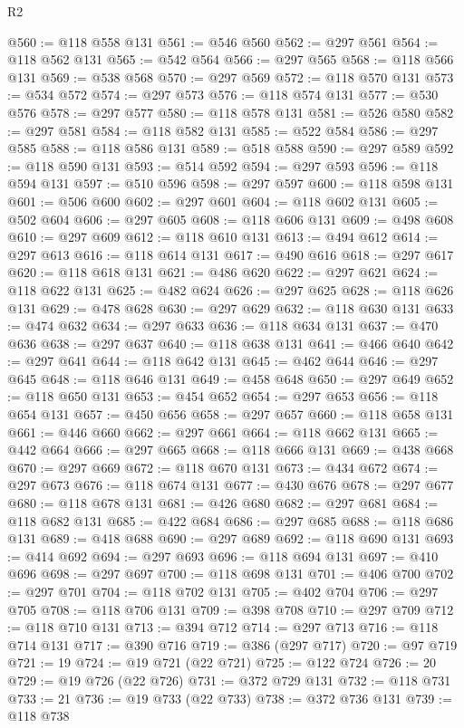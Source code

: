 \begin{lexlean}{R2}
\begin{coremodule}
@560 := @118 @558 @131
@561 := @546 @560
@562 := @297 @561
@564 := @118 @562 @131
@565 := @542 @564
@566 := @297 @565
@568 := @118 @566 @131
@569 := @538 @568
@570 := @297 @569
@572 := @118 @570 @131
@573 := @534 @572
@574 := @297 @573
@576 := @118 @574 @131
@577 := @530 @576
@578 := @297 @577
@580 := @118 @578 @131
@581 := @526 @580
@582 := @297 @581
@584 := @118 @582 @131
@585 := @522 @584
@586 := @297 @585
@588 := @118 @586 @131
@589 := @518 @588
@590 := @297 @589
@592 := @118 @590 @131
@593 := @514 @592
@594 := @297 @593
@596 := @118 @594 @131
@597 := @510 @596
@598 := @297 @597
@600 := @118 @598 @131
@601 := @506 @600
@602 := @297 @601
@604 := @118 @602 @131
@605 := @502 @604
@606 := @297 @605
@608 := @118 @606 @131
@609 := @498 @608
@610 := @297 @609
@612 := @118 @610 @131
@613 := @494 @612
@614 := @297 @613
@616 := @118 @614 @131
@617 := @490 @616
@618 := @297 @617
@620 := @118 @618 @131
@621 := @486 @620
@622 := @297 @621
@624 := @118 @622 @131
@625 := @482 @624
@626 := @297 @625
@628 := @118 @626 @131
@629 := @478 @628
@630 := @297 @629
@632 := @118 @630 @131
@633 := @474 @632
@634 := @297 @633
@636 := @118 @634 @131
@637 := @470 @636
@638 := @297 @637
@640 := @118 @638 @131
@641 := @466 @640
@642 := @297 @641
@644 := @118 @642 @131
@645 := @462 @644
@646 := @297 @645
@648 := @118 @646 @131
@649 := @458 @648
@650 := @297 @649
@652 := @118 @650 @131
@653 := @454 @652
@654 := @297 @653
@656 := @118 @654 @131
@657 := @450 @656
@658 := @297 @657
@660 := @118 @658 @131
@661 := @446 @660
@662 := @297 @661
@664 := @118 @662 @131
@665 := @442 @664
@666 := @297 @665
@668 := @118 @666 @131
@669 := @438 @668
@670 := @297 @669
@672 := @118 @670 @131
@673 := @434 @672
@674 := @297 @673
@676 := @118 @674 @131
@677 := @430 @676
@678 := @297 @677
@680 := @118 @678 @131
@681 := @426 @680
@682 := @297 @681
@684 := @118 @682 @131
@685 := @422 @684
@686 := @297 @685
@688 := @118 @686 @131
@689 := @418 @688
@690 := @297 @689
@692 := @118 @690 @131
@693 := @414 @692
@694 := @297 @693
@696 := @118 @694 @131
@697 := @410 @696
@698 := @297 @697
@700 := @118 @698 @131
@701 := @406 @700
@702 := @297 @701
@704 := @118 @702 @131
@705 := @402 @704
@706 := @297 @705
@708 := @118 @706 @131
@709 := @398 @708
@710 := @297 @709
@712 := @118 @710 @131
@713 := @394 @712
@714 := @297 @713
@716 := @118 @714 @131
@717 := @390 @716
@719 := @386 (@297 @717)
@720 := @97 @719
@721 := 19
@724 := @19 @721 (@22 @721)
@725 := @122 @724
@726 := 20
@729 := @19 @726 (@22 @726)
@731 := @372 @729 @131
@732 := @118 @731
@733 := 21
@736 := @19 @733 (@22 @733)
@738 := @372 @736 @131
@739 := @118 @738

\end{coremodule}
\end{lexlean}
